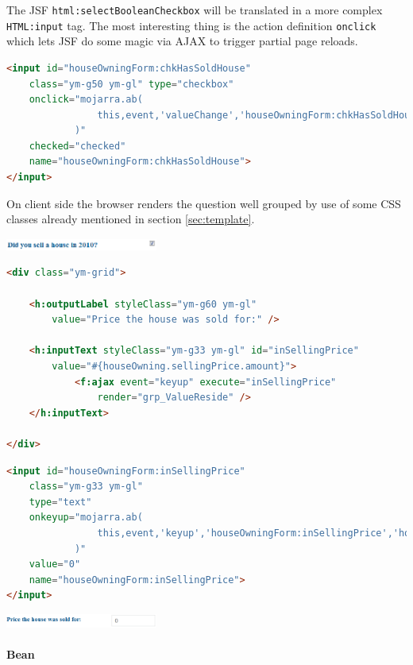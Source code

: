 The JSF \texttt{html:selectBooleanCheckbox} will be translated in a more complex
\texttt{HTML:input} tag. The most interesting thing is the action definition
\texttt{onclick} which lets JSF do some magic via AJAX to trigger partial page
reloads.

\begin{lstlisting}[language=HTML]
<input id="houseOwningForm:chkHasSoldHouse" 
	class="ym-g50 ym-gl" type="checkbox"
	onclick="mojarra.ab(
				this,event,'valueChange','houseOwningForm:chkHasSoldHouse','houseOwningForm:grp_hasSoldHouse_hasBoughtHouse'
			)"
	checked="checked" 
	name="houseOwningForm:chkHasSoldHouse">
</input>
\end{lstlisting}
    
On client side the browser renders the question well grouped by use of some CSS
classes already mentioned in section \ref{sec:template}.

 \includegraphics[width=5cm]{./images/chapter02/referenceimpl_forms_bool.png}


\begin{lstlisting}[language=HTML]
<div class="ym-grid">

	<h:outputLabel styleClass="ym-g60 ym-gl"
		value="Price the house was sold for:" />

	<h:inputText styleClass="ym-g33 ym-gl" id="inSellingPrice"
		value="#{houseOwning.sellingPrice.amount}">
			<f:ajax event="keyup" execute="inSellingPrice"
				render="grp_ValueReside" />
	</h:inputText>

</div>
\end{lstlisting}

\begin{lstlisting}[language=HTML]
<input id="houseOwningForm:inSellingPrice" 
	class="ym-g33 ym-gl" 
	type="text"
	onkeyup="mojarra.ab(
				this,event,'keyup','houseOwningForm:inSellingPrice','houseOwningForm:grp_ValueReside'
			)"
	value="0" 
	name="houseOwningForm:inSellingPrice">
</input>
\end{lstlisting}

 \includegraphics[width=5cm]{./images/chapter02/referenceimpl_forms_text.png}

\paragraph{Bean}





